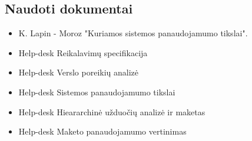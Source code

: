 	\subsection{Naudoti dokumentai}
	
	\begin{itemize}
	\item K. Lapin - Moroz "Kuriamos sistemos panaudojamumo tikslai".
	\item Help-desk Reikalavimų specifikacija
	\item Help-desk Verslo poreikių analizė
	\item Help-desk Sistemos panaudojamumo tikslai
	\item Help-desk Hieararchinė užduočių analizė ir maketas
	\item Help-desk Maketo panaudojamumo vertinimas
	\end{itemize}
	